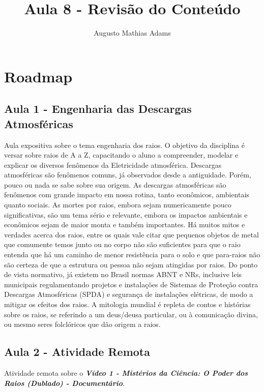 \documentclass[a4paper, 12pt, onecolumn,singlespacing]{article}
\title{Aula 8 - Revisão do Conteúdo}
\author[1]{Augusto Mathias Adams}
\affil[1]{augusto.adams@ufpr.br}
\begin{document}
	
	\maketitle
	
	\section{Roadmap}
	\subsection{Aula 1 - Engenharia das Descargas Atmosféricas}
	
	Aula expositiva sobre o tema engenharia dos raios. O objetivo da disciplina é versar sobre raios de A a Z, capacitando o aluno a compreender, modelar e explicar os diversos fenômenos da Eletricidade atmosférica. Descargas atmosféricas são fenômenos comuns, já observados desde a antiguidade. Porém, pouco ou nada se sabe sobre sua origem. As descargas atmosféricas são fenômenos com grande impacto em nossa rotina, tanto econômicos,	ambientais quanto sociais. As mortes por raios, embora sejam numericamente pouco significativas, são um tema sério e relevante, embora os impactos ambientais e econômicos sejam de maior monta e também importantes. Há muitos mitos e verdades acerca dos raios, entre os quais vale citar que pequenos objetos de metal que comumente temos junto ou no corpo não são suficientes para que o raio entenda que há um caminho de menor resistência para o solo e que para-raios não são certeza de que a estrutura ou pessoa não sejam atingidas por raios. Do ponto de vista normativo, já existem no Brasil normas ABNT e NRs, inclusive leis municipais regulamentando projetos e instalações de Sistemas de Proteção contra Descargas Atmosféricas (SPDA) e segurança de instalações elétricas, de modo a mitigar os efeitos dos raios. A mitologia mundial é repleta de contos e histórias sobre os raios, se referindo a um deus/deusa particular, ou à comunicação divina, ou mesmo seres folclóricos que dão origem a raios.
	
	\subsection{Aula 2 - Atividade Remota}
	
	Atividade remota sobre o \textbf{\textit{Vídeo 1 - Mistérios da Ciência: O Poder dos Raios (Dublado) - Documentário}}.
	
\end{document}

